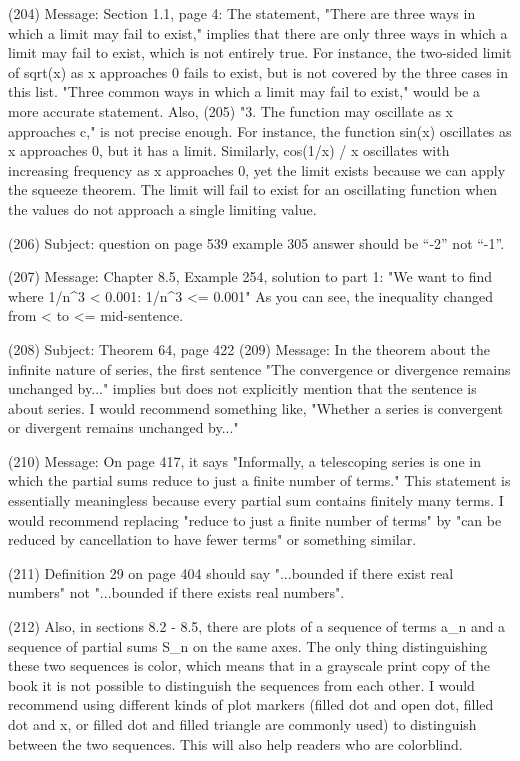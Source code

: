 {(204)  Message: Section 1.1, page 4: The statement, "There are three ways in which a limit may fail to exist," implies that there are only three ways in which a limit may fail to exist, which is not entirely true. For instance, the two-sided limit of sqrt(x) as x approaches 0 fails to exist, but is not covered by the three cases in this list. "Three common ways in which a limit may fail to exist," would be a more accurate statement. Also,   
(205)  "3. The function may oscillate as x approaches c," is not precise enough. For instance, the function sin(x) oscillates as x approaches 0, but it has a limit. Similarly, cos(1/x) / x oscillates with increasing frequency as x approaches 0, yet the limit exists because we can apply the squeeze theorem. The limit will fail to exist for an oscillating function when the values do not approach a single limiting value.

(206)  Subject: question on page 539 example 305     answer should be ``-2'' not ``-1''.

(207)  Message: Chapter 8.5, Example 254, solution to part 1: "We want to find where 1/n^3 < 0.001: 1/n^3 <= 0.001" As you can see, the inequality changed from < to <= mid-sentence.

(208)  Subject: Theorem 64, page 422
(209)  Message: In the theorem about the infinite nature of series, the first sentence "The convergence or divergence remains unchanged by..." implies but does not explicitly mention that the sentence is about series. I would recommend something like, "Whether a series is convergent or divergent remains unchanged by..."

(210)  Message: On page 417, it says "Informally, a telescoping series is one in which the partial sums reduce to just a finite number of terms." This statement is essentially meaningless because every partial sum contains finitely many terms. I would recommend replacing "reduce to just a finite number of terms" by "can be reduced by cancellation to have fewer terms" or something similar.

(211)  Definition 29 on page 404 should say "...bounded if there exist real numbers" not "...bounded if there exists real numbers".

(212)  Also, in sections 8.2 - 8.5, there are plots of a sequence of terms a_n and a sequence of partial sums S_n on the same axes. The only thing distinguishing these two sequences is color, which means that in a grayscale print copy of the book it is not possible to distinguish the sequences from each other. I would recommend using different kinds of plot markers (filled dot and open dot, filled dot and x, or filled dot and filled triangle are commonly used) to distinguish between the two sequences. This will also help readers who are colorblind.

}
